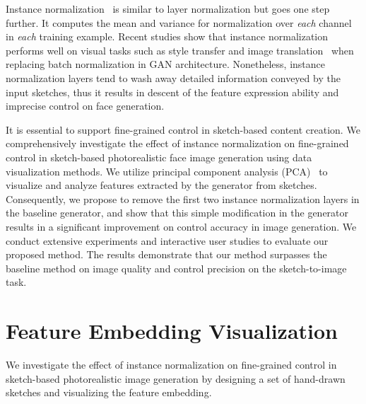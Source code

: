 \documentclass{article}
\newcommand{\dlt}[1]{{}}
\begin{document}
Instance normalization~\cite{instance_norm} is similar to layer normalization but goes one step further. It computes the mean and variance for normalization over \emph{each} channel in \emph{each} training example.
Recent studies show that instance normalization performs well on visual tasks such as style transfer and image translation~\cite{pix2pixhd,spade,cyclegan} when replacing batch normalization in GAN architecture. 
Nonetheless, instance normalization layers tend to wash away detailed information conveyed by the input sketches, thus it results in descent of the feature expression ability and imprecise control on face generation. 

It is essential to support fine-grained control in sketch-based content creation. 
We comprehensively investigate the effect of instance normalization on fine-grained control in sketch-based photorealistic face image generation using data visualization methods. 
We utilize principal component analysis (PCA)~\cite{pca} to visualize and analyze features extracted by the generator from sketches. 
Consequently, we propose to remove the first two instance normalization layers in the baseline generator, and show that this simple modification in the generator results in a significant improvement on control accuracy in image generation. 
We conduct extensive experiments and interactive user studies to evaluate our proposed method. The results demonstrate that our method surpasses the baseline method on image quality and control precision on the sketch-to-image task.


\section{Feature Embedding Visualization}
\label{sec:visualize}

We investigate the effect of instance normalization on fine-grained control in sketch-based photorealistic image generation by designing a set of hand-drawn sketches and visualizing the feature embedding.
\dlt{In Sec.~\ref{sec:pix2pixhd}, we review our baseline method pix2pixHD.
In Sec.~\ref{sec:visualize}, we visualize the feature embedding from hand-drawn sketches by the generator of pix2pixHD, and analyze the visualization results to investigate the effect of instance normalization. 
Based on the analysis, we introduce our design on the generator network for sketch-based face generation in Sec.~\ref{sec:network}.
}
\end{document}
